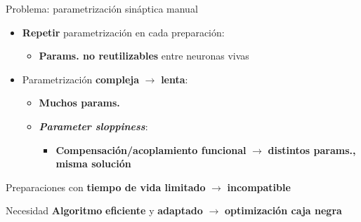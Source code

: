 \documentclass[10pt, aspectratio=169]{beamer}
\begin{document}
\begin{frame}{Problema: parametrización sináptica manual}
    \begin{itemize}
        \item \textbf{Repetir} parametrización en cada preparación:
              \begin{itemize}
                  \item[] \textbf{Params. no reutilizables} entre neuronas vivas
              \end{itemize}
        \item Parametrización \textbf{compleja} $\to$ \textbf{lenta}:
              \begin{itemize}
                  \item \textbf{Muchos params.}
                  \item \textbf{\textit{Parameter sloppiness}}:
                        \begin{itemize}
                            \item[] \textbf{Compensación/acoplamiento funcional} $\to$ \textbf{distintos params., misma solución}
                        \end{itemize}
              \end{itemize}
    \end{itemize}
    \vspace{0.8em}
    Preparaciones con \textbf{tiempo de vida limitado} $\to$ \textbf{incompatible}
    \vspace{0.8em}
    \begin{block}{Necesidad}
        \textbf{Algoritmo} \textbf{eficiente} y \textbf{adaptado} $\to$ \textbf{optimización caja negra}
    \end{block}
\end{frame}
\end{document}
